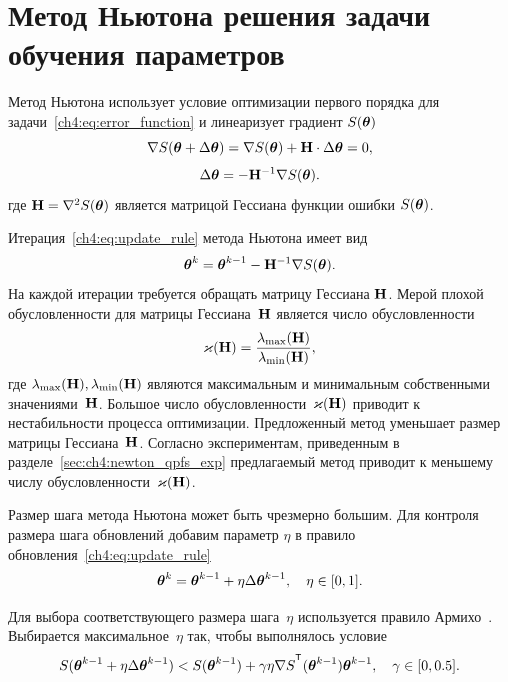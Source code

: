 \section{Метод Ньютона решения задачи обучения параметров}
\label{sec:ch4:newton_algorithm}

Метод Ньютона использует условие оптимизации первого порядка для задачи~\eqref{ch4:eq:error_function} и линеаризует градиент $S (\boldsymbol{\theta})$
\[
	\nabla S (\boldsymbol{\theta} + \Delta \boldsymbol{\theta}) = \nabla S(\boldsymbol{\theta}) + \mathbf{H} \cdot \Delta \boldsymbol{\theta} = 0,
\]
\[
	\Delta \boldsymbol{\theta} = - \mathbf{H}^{-1} \nabla S(\boldsymbol{\theta}).
\]
где $\mathbf{H} = \nabla^2 S(\boldsymbol{\theta})$ является матрицой Гессиана функции ошибки $S(\boldsymbol{\theta})$.

Итерация~\eqref{ch4:eq:update_rule} метода Ньютона имеет вид
\[
	\boldsymbol{\theta}^k = \boldsymbol{\theta}^{k-1} - \mathbf{H}^{-1} \nabla S(\boldsymbol{\theta}).
\]
На каждой итерации требуется обращать матрицу Гессиана $\mathbf{H}$.
Мерой плохой обусловленности для матрицы Гессиана~$\mathbf{H}$ является число обусловленности
\[
	\varkappa(\mathbf{H}) = \frac{\lambda_{\text{max}}(\mathbf{H})}{\lambda_{\text{min}}(\mathbf{H})},
\]
где $\lambda_{\text{max}}(\mathbf{H}), \lambda_{\text{min}}(\mathbf{H})$ являются максимальным и минимальным собственными значениями~$\mathbf{H}$. Большое число обусловленности~$\varkappa (\mathbf{H})$ приводит к нестабильности процесса оптимизации.
Предложенный метод уменьшает размер матрицы Гессиана~$\mathbf{H}$. Согласно экспериментам, приведенным в разделе~\ref{sec:ch4:newton_qpfs_exp} предлагаемый метод приводит к меньшему числу обусловленности~$\varkappa (\mathbf{H})$.

Размер шага метода Ньютона может быть чрезмерно большим. Для контроля размера шага обновлений добавим параметр $\eta$ в правило обновления~\eqref{ch4:eq:update_rule}
\[
	\boldsymbol{\theta}^k = \boldsymbol{\theta}^{k - 1} + \eta \Delta \boldsymbol{\theta}^{k - 1}, \quad \eta \in [0, 1].
\]

Для выбора соответствующего размера шага~$\eta$ используется правило Армихо~\cite{armijo1966minimization}. Выбирается максимальное~$\eta$ так, чтобы выполнялось условие
\[
	S(\btheta^{k - 1} + \eta \Delta \btheta^{k - 1}) < S(\btheta^{k - 1}) + \gamma \eta \nabla S^{\T}(\btheta^{k-1})\btheta^{k - 1}, \quad \gamma \in [0, 0.5].
\]

